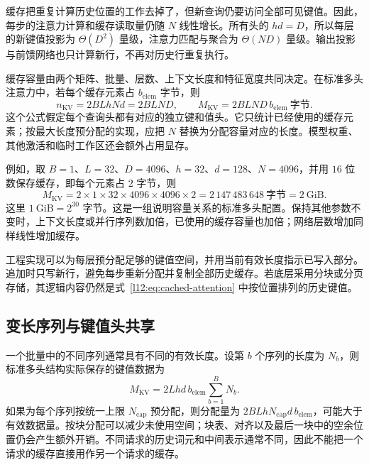 缓存把重复计算历史位置的工作去掉了，但新查询仍要访问全部可见键值。因此，每步的注意力计算和缓存读取量仍随 $N$ 线性增长。所有头的 $hd=D$，所以每层的新键值投影为 $\Theta(D^2)$ 量级，注意力匹配与聚合为 $\Theta(ND)$ 量级。输出投影与前馈网络也只计算新行，不再对历史行重复执行。

缓存容量由两个矩阵、批量、层数、上下文长度和特征宽度共同决定。在标准多头注意力中，若每个缓存元素占 $b_{\mathrm{elem}}$ 字节，则
\begin{equation}
  n_{\mathrm{KV}}=2BLhNd=2BLND,\qquad
  M_{\mathrm{KV}}=2BLND\,b_{\mathrm{elem}}\ \text{字节}.
  \label{l12:eq:kv-memory}
\end{equation}
这个公式假定每个查询头都有对应的独立键和值头。它只统计已经使用的缓存元素；按最大长度预分配的实现，应把 $N$ 替换为分配容量对应的长度。模型权重、其他激活和临时工作区还会额外占用显存。

例如，取 $B=1$、$L=32$、$D=4096$、$h=32$、$d=128$、$N=4096$，并用 $16$ 位数保存缓存，即每个元素占 $2$ 字节，则
\begin{equation}
  M_{\mathrm{KV}}
  =2\times1\times32\times4096\times4096\times2
  =2\,147\,483\,648\ \text{字节}
  =2\ \mathrm{GiB}.
  \label{l12:eq:kv-example}
\end{equation}
这里 $1\ \mathrm{GiB}=2^{30}$ 字节。这是一组说明容量关系的标准多头配置。保持其他参数不变时，上下文长度或并行序列数加倍，已使用的缓存容量也加倍；网络层数增加同样线性增加缓存。

工程实现可以为每层预分配足够的键值空间，并用当前有效长度指示已写入部分。追加时只写新行，避免每步重新分配并复制全部历史缓存。若底层采用分块或分页存储，其逻辑内容仍然是式~\eqref{l12:eq:cached-attention} 中按位置排列的历史键值。


\subsection{变长序列与键值头共享}

一个批量中的不同序列通常具有不同的有效长度。设第 $b$ 个序列的长度为 $N_b$，则标准多头结构实际保存的键值数据为
\begin{equation}
 M_{\mathrm{KV}}=2Lhd\,b_{\mathrm{elem}}\sum_{b=1}^{B}N_b.
 \label{l12:eq:variable-kv}
\end{equation}
如果为每个序列按统一上限 $N_{\mathrm{cap}}$ 预分配，则分配量为 $2BLhN_{\mathrm{cap}}d\,b_{\mathrm{elem}}$，可能大于有效数据量。按块分配可以减少未使用空间；块表、对齐以及最后一块中的空余位置仍会产生额外开销。不同请求的历史词元和中间表示通常不同，因此不能把一个请求的缓存直接用作另一个请求的缓存。

